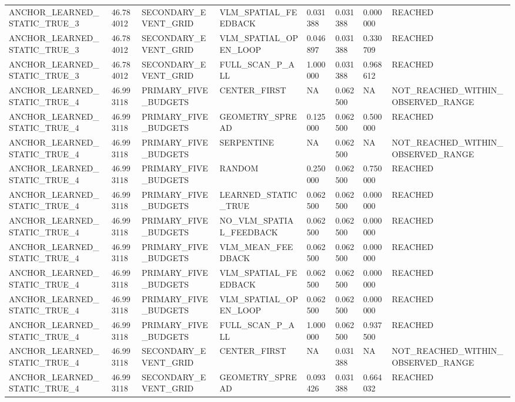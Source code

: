 \begin{tabular}{llllllll}
ANCHOR\_LEARNED\_STATIC\_TRUE\_3 & 46.784012 & SECONDARY\_EVENT\_GRID & VLM\_SPATIAL\_FEEDBACK & 0.031388 & 0.031388 & 0.000000 & REACHED \\
ANCHOR\_LEARNED\_STATIC\_TRUE\_3 & 46.784012 & SECONDARY\_EVENT\_GRID & VLM\_SPATIAL\_OPEN\_LOOP & 0.046897 & 0.031388 & 0.330709 & REACHED \\
ANCHOR\_LEARNED\_STATIC\_TRUE\_3 & 46.784012 & SECONDARY\_EVENT\_GRID & FULL\_SCAN\_P\_ALL & 1.000000 & 0.031388 & 0.968612 & REACHED \\
ANCHOR\_LEARNED\_STATIC\_TRUE\_4 & 46.993118 & PRIMARY\_FIVE\_BUDGETS & CENTER\_FIRST & NA & 0.062500 & NA & NOT\_REACHED\_WITHIN\_OBSERVED\_RANGE \\
ANCHOR\_LEARNED\_STATIC\_TRUE\_4 & 46.993118 & PRIMARY\_FIVE\_BUDGETS & GEOMETRY\_SPREAD & 0.125000 & 0.062500 & 0.500000 & REACHED \\
ANCHOR\_LEARNED\_STATIC\_TRUE\_4 & 46.993118 & PRIMARY\_FIVE\_BUDGETS & SERPENTINE & NA & 0.062500 & NA & NOT\_REACHED\_WITHIN\_OBSERVED\_RANGE \\
ANCHOR\_LEARNED\_STATIC\_TRUE\_4 & 46.993118 & PRIMARY\_FIVE\_BUDGETS & RANDOM & 0.250000 & 0.062500 & 0.750000 & REACHED \\
ANCHOR\_LEARNED\_STATIC\_TRUE\_4 & 46.993118 & PRIMARY\_FIVE\_BUDGETS & LEARNED\_STATIC\_TRUE & 0.062500 & 0.062500 & 0.000000 & REACHED \\
ANCHOR\_LEARNED\_STATIC\_TRUE\_4 & 46.993118 & PRIMARY\_FIVE\_BUDGETS & NO\_VLM\_SPATIAL\_FEEDBACK & 0.062500 & 0.062500 & 0.000000 & REACHED \\
ANCHOR\_LEARNED\_STATIC\_TRUE\_4 & 46.993118 & PRIMARY\_FIVE\_BUDGETS & VLM\_MEAN\_FEEDBACK & 0.062500 & 0.062500 & 0.000000 & REACHED \\
ANCHOR\_LEARNED\_STATIC\_TRUE\_4 & 46.993118 & PRIMARY\_FIVE\_BUDGETS & VLM\_SPATIAL\_FEEDBACK & 0.062500 & 0.062500 & 0.000000 & REACHED \\
ANCHOR\_LEARNED\_STATIC\_TRUE\_4 & 46.993118 & PRIMARY\_FIVE\_BUDGETS & VLM\_SPATIAL\_OPEN\_LOOP & 0.062500 & 0.062500 & 0.000000 & REACHED \\
ANCHOR\_LEARNED\_STATIC\_TRUE\_4 & 46.993118 & PRIMARY\_FIVE\_BUDGETS & FULL\_SCAN\_P\_ALL & 1.000000 & 0.062500 & 0.937500 & REACHED \\
ANCHOR\_LEARNED\_STATIC\_TRUE\_4 & 46.993118 & SECONDARY\_EVENT\_GRID & CENTER\_FIRST & NA & 0.031388 & NA & NOT\_REACHED\_WITHIN\_OBSERVED\_RANGE \\
ANCHOR\_LEARNED\_STATIC\_TRUE\_4 & 46.993118 & SECONDARY\_EVENT\_GRID & GEOMETRY\_SPREAD & 0.093426 & 0.031388 & 0.664032 & REACHED \\

\end{tabular}

